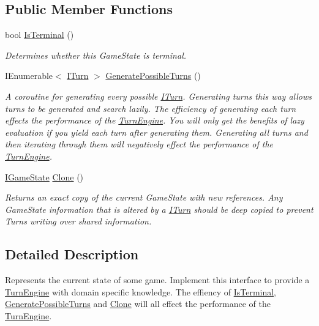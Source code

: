 \subsection*{Public Member Functions}
\begin{DoxyCompactItemize}
\item 
bool \hyperlink{interface_universal_turn_based_a_i_1_1_i_game_state_ac6c55bbcda732fbae17d4fa686258a57}{Is\+Terminal} ()
\begin{DoxyCompactList}\small\item\em Determines whether this Game\+State is terminal. \end{DoxyCompactList}\item 
I\+Enumerable$<$ \hyperlink{interface_universal_turn_based_a_i_1_1_i_turn}{I\+Turn} $>$ \hyperlink{interface_universal_turn_based_a_i_1_1_i_game_state_a1f0360d2154d764f124e1d83b67b21c4}{Generate\+Possible\+Turns} ()
\begin{DoxyCompactList}\small\item\em A coroutine for generating every possible \hyperlink{interface_universal_turn_based_a_i_1_1_i_turn}{I\+Turn}. Generating turns this way allows turns to be generated and search lazily. The efficiency of generating each turn effects the performance of the \hyperlink{class_universal_turn_based_a_i_1_1_turn_engine}{Turn\+Engine}. You will only get the benefits of lazy evaluation if you yield each turn after generating them. Generating all turns and then iterating through them will negatively effect the performance of the \hyperlink{class_universal_turn_based_a_i_1_1_turn_engine}{Turn\+Engine}. \end{DoxyCompactList}\item 
\hyperlink{interface_universal_turn_based_a_i_1_1_i_game_state}{I\+Game\+State} \hyperlink{interface_universal_turn_based_a_i_1_1_i_game_state_a0a89b8e0ff0821f4715dcca7b612c6be}{Clone} ()
\begin{DoxyCompactList}\small\item\em Returns an exact copy of the current Game\+State with new references. Any Game\+State information that is altered by a \hyperlink{interface_universal_turn_based_a_i_1_1_i_turn}{I\+Turn} should be deep copied to prevent Turns writing over shared information. \end{DoxyCompactList}\end{DoxyCompactItemize}


\subsection{Detailed Description}
Represents the current state of some game. Implement this interface to provide a \hyperlink{class_universal_turn_based_a_i_1_1_turn_engine}{Turn\+Engine} with domain specific knowledge. The effiency of \hyperlink{interface_universal_turn_based_a_i_1_1_i_game_state_ac6c55bbcda732fbae17d4fa686258a57}{Is\+Terminal}, \hyperlink{interface_universal_turn_based_a_i_1_1_i_game_state_a1f0360d2154d764f124e1d83b67b21c4}{Generate\+Possible\+Turns} and \hyperlink{interface_universal_turn_based_a_i_1_1_i_game_state_a0a89b8e0ff0821f4715dcca7b612c6be}{Clone} will all effect the performance of the \hyperlink{class_universal_turn_based_a_i_1_1_turn_engine}{Turn\+Engine}. 

